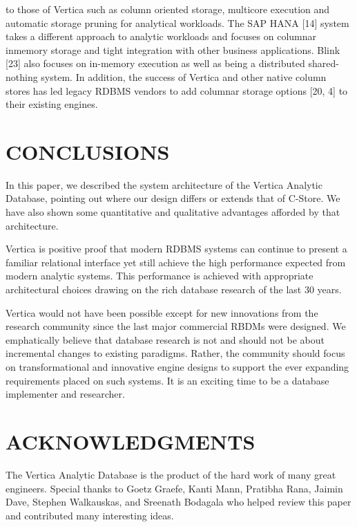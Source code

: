 \documentclass[a4paper,12pt,notitlepage,twoside,openright]{article}
\begin{document}
to those of Vertica such as column oriented storage, multicore execution
and automatic storage pruning for analytical workloads. The SAP HANA
{[}14{]} system takes a different approach to analytic workloads and
focuses on columnar inmemory storage and tight integration with other
business applications. Blink {[}23{]} also focuses on in-memory
execution as well as being a distributed shared-nothing system. In
addition, the success of Vertica and other native column stores has led
legacy RDBMS vendors to add columnar storage options {[}20, 4{]} to
their existing engines.

\hypertarget{conclusions}{%
\section{CONCLUSIONS}\label{conclusions}}

In this paper, we described the system architecture of the Vertica
Analytic Database, pointing out where our design differs or extends that
of C-Store. We have also shown some quantitative and qualitative
advantages afforded by that architecture.

Vertica is positive proof that modern RDBMS systems can continue to
present a familiar relational interface yet still achieve the high
performance expected from modern analytic systems. This performance is
achieved with appropriate architectural choices drawing on the rich
database research of the last 30 years.

Vertica would not have been possible except for new innovations from the
research community since the last major commercial RBDMs were designed.
We emphatically believe that database research is not and should not be
about incremental changes to existing paradigms. Rather, the community
should focus on transformational and innovative engine designs to
support the ever expanding requirements placed on such systems. It is an
exciting time to be a database implementer and researcher.

\hypertarget{acknowledgments}{%
\section{ACKNOWLEDGMENTS}\label{acknowledgments}}

The Vertica Analytic Database is the product of the hard work of many
great engineers. Special thanks to Goetz Graefe, Kanti Mann, Pratibha
Rana, Jaimin Dave, Stephen Walkauskas, and Sreenath Bodagala who helped
review this paper and contributed many interesting ideas.
\end{document}
